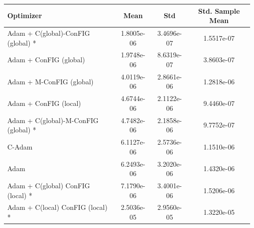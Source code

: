 \begin{table}[H]
    \centering
    \label{tab:optimizer_results}
    \begin{tabular}{lccc}
        \toprule
        \textbf{Optimizer} & \textbf{Mean} & \textbf{Std} & \textbf{Std. Sample Mean} \\
        \midrule
        Adam + C(global)-ConFIG (global) * & 1.8005e-06 & 3.4696e-07 & 1.5517e-07 \\
        Adam + ConFIG (global) & 1.9748e-06 & 8.6319e-07 & 3.8603e-07 \\
        Adam + M-ConFIG (global) & 4.0119e-06 & 2.8661e-06 & 1.2818e-06 \\
        Adam + ConFIG (local) & 4.6744e-06 & 2.1122e-06 & 9.4460e-07 \\
        Adam + C(global)-M-ConFIG (global) * & 4.7482e-06 & 2.1858e-06 & 9.7752e-07 \\
        C-Adam & 6.1127e-06 & 2.5736e-06 & 1.1510e-06 \\
        Adam & 6.2493e-06 & 3.2020e-06 & 1.4320e-06 \\
        Adam + C(global) ConFIG (local) * & 7.1790e-06 & 3.4001e-06 & 1.5206e-06 \\
        Adam + C(local) ConFIG (local) * & 2.5036e-05 & 2.9560e-05 & 1.3220e-05 \\
        \bottomrule
    \end{tabular}
\end{table}
